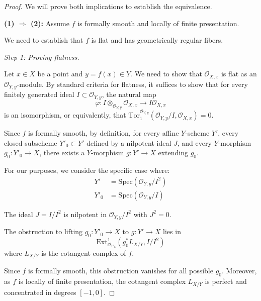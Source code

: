 \documentclass[12pt]{article}
\begin{document}
\begin{proof}
    We will prove both implications to establish the equivalence.

    \medskip
    \noindent \textbf{(1) $\Rightarrow$ (2):} Assume $f$ is formally smooth and locally of finite presentation.

    \medskip
    \noindent We need to establish that $f$ is flat and has geometrically regular fibers.

    \medskip
    \noindent \textit{Step 1: Proving flatness.}

    \medskip
    \noindent Let $x \in X$ be a point and $y = f(x) \in Y$. We need to show that $\mathcal{O}_{X,x}$ is flat as an $\mathcal{O}_{Y,y}$-module. By standard criteria for flatness, it suffices to show that for every finitely generated ideal $I \subset \mathcal{O}_{Y,y}$, the natural map
    \begin{equation}
        \varphi: I \otimes_{\mathcal{O}_{Y,y}} \mathcal{O}_{X,x} \to I\mathcal{O}_{X,x}
    \end{equation}
    is an isomorphism, or equivalently, that $\text{Tor}_1^{\mathcal{O}_{Y,y}}(\mathcal{O}_{Y,y}/I, \mathcal{O}_{X,x}) = 0$.

    \medskip
    \noindent Since $f$ is formally smooth, by definition, for every affine $Y$-scheme $Y'$, every closed subscheme $Y'_0 \subset Y'$ defined by a nilpotent ideal $J$, and every $Y$-morphism $g_0: Y'_0 \to X$, there exists a $Y$-morphism $g: Y' \to X$ extending $g_0$.

    \medskip
    \noindent For our purposes, we consider the specific case where:
    \begin{align}
        Y'   & = \text{Spec}(\mathcal{O}_{Y,y}/I^2) \\
        Y'_0 & = \text{Spec}(\mathcal{O}_{Y,y}/I)
    \end{align}

    \noindent The ideal $J = I/I^2$ is nilpotent in $\mathcal{O}_{Y,y}/I^2$ with $J^2 = 0$.

    \medskip
    \noindent The obstruction to lifting $g_0: Y'_0 \to X$ to $g: Y' \to X$ lies in
    \begin{equation}
        \text{Ext}^1_{\mathcal{O}_{Y'_0}}(g_0^*L_{X/Y}, I/I^2)
    \end{equation}
    where $L_{X/Y}$ is the cotangent complex of $f$.

    \medskip
    \noindent Since $f$ is formally smooth, this obstruction vanishes for all possible $g_0$. Moreover, as $f$ is locally of finite presentation, the cotangent complex $L_{X/Y}$ is perfect and concentrated in degrees $[-1,0]$.


\end{proof}
\end{document}
